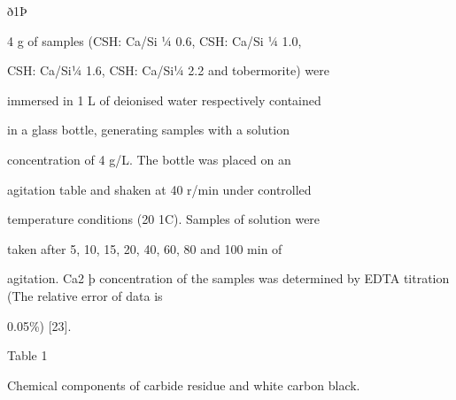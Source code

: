 \documentclass[a4paper,portrait,12pt]{article}
\begin{document}
\begin{flushleft}
ð1Þ
\end{flushleft}





\begin{flushleft}
4 g of samples (CSH: Ca/Si ¼ 0.6, CSH: Ca/Si ¼ 1.0,
\end{flushleft}


\begin{flushleft}
CSH: Ca/Si¼ 1.6, CSH: Ca/Si¼ 2.2 and tobermorite) were
\end{flushleft}


\begin{flushleft}
immersed in 1 L of deionised water respectively contained
\end{flushleft}


\begin{flushleft}
in a glass bottle, generating samples with a solution
\end{flushleft}


\begin{flushleft}
concentration of 4 g/L. The bottle was placed on an
\end{flushleft}


\begin{flushleft}
agitation table and shaken at 40 r/min under controlled
\end{flushleft}


\begin{flushleft}
temperature conditions (20 1C). Samples of solution were
\end{flushleft}


\begin{flushleft}
taken after 5, 10, 15, 20, 40, 60, 80 and 100 min of
\end{flushleft}


\begin{flushleft}
agitation. Ca2 þ concentration of the samples was determined by EDTA titration (The relative error of data is
\end{flushleft}


0.05\%) [23].





\begin{flushleft}
Table 1
\end{flushleft}


\begin{flushleft}
Chemical components of carbide residue and white carbon black.
\end{flushleft}
\end{document}
